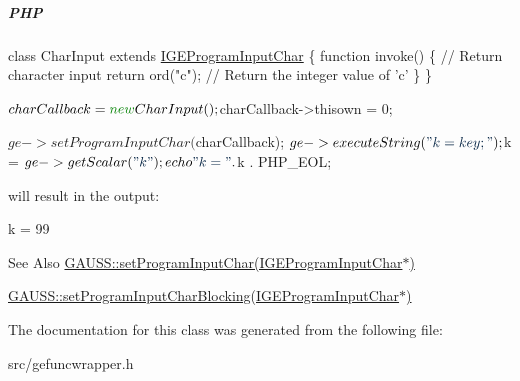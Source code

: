 \subparagraph*{P\-H\-P}


\begin{DoxyCode}
\textcolor{keyword}{class }CharInput \textcolor{keyword}{extends} \hyperlink{class_i_g_e_program_input_char}{IGEProgramInputChar} \{
    \textcolor{keyword}{function} invoke() \{
        \textcolor{comment}{// Return character input}
        \textcolor{keywordflow}{return} ord(\textcolor{stringliteral}{"c"}); \textcolor{comment}{// Return the integer value of 'c'}
    \}
\}

$charCallback = \textcolor{keyword}{new} CharInput();
$charCallback->thisown = 0;

$ge->setProgramInputChar($charCallback);
$ge->executeString(\textcolor{stringliteral}{"k = key;"});

$k = $ge->getScalar(\textcolor{stringliteral}{"k"});
echo \textcolor{stringliteral}{"k = "} . $k . PHP\_EOL;
\end{DoxyCode}
 will result in the output\-: 
\begin{DoxyCode}
k = 99
\end{DoxyCode}


\begin{DoxySeeAlso}{See Also}
\hyperlink{class_g_a_u_s_s_a71a60afb143ae00b18d6fe3fd99f316d}{G\-A\-U\-S\-S\-::set\-Program\-Input\-Char(\-I\-G\-E\-Program\-Input\-Char$\ast$)} 

\hyperlink{class_g_a_u_s_s_a300d6e33dbfd2a45f56ff2769f585435}{G\-A\-U\-S\-S\-::set\-Program\-Input\-Char\-Blocking(\-I\-G\-E\-Program\-Input\-Char$\ast$)} 
\end{DoxySeeAlso}


The documentation for this class was generated from the following file\-:\begin{DoxyCompactItemize}
\item 
src/gefuncwrapper.\-h\end{DoxyCompactItemize}
